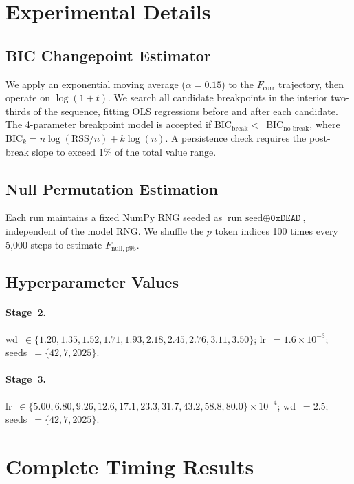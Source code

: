 \documentclass{article}
\newcommand{\fcorr}{F_{\mathrm{corr}}}
\begin{document}
\section{Experimental Details}
\label{app:details}

\subsection{BIC Changepoint Estimator}

We apply an exponential moving average ($\alpha{=}0.15$) to the
$\fcorr$ trajectory, then operate on $\log(1+t)$.
We search all candidate breakpoints in the interior two-thirds of
the sequence, fitting OLS regressions before and after each candidate.
The 4-parameter breakpoint model is accepted if BIC$_{\text{break}}
<$~BIC$_{\text{no-break}}$, where BIC$_k = n\log(\text{RSS}/n)
+ k\log(n)$.
A persistence check requires the post-break slope to exceed 1\% of
the total value range.

\subsection{Null Permutation Estimation}

Each run maintains a fixed NumPy RNG seeded as
$\text{run\_seed}\oplus\texttt{0xDEAD}$, independent of the model
RNG.
We shuffle the $p$ token indices 100 times every 5{,}000 steps to
estimate $F_{\mathrm{null,p95}}$.

\subsection{Hyperparameter Values}

\paragraph{Stage~2.}
wd~$\in\{1.20, 1.35, 1.52, 1.71, 1.93, 2.18, 2.45, 2.76, 3.11,
3.50\}$; lr~$=1.6\times10^{-3}$; seeds~$=\{42,7,2025\}$.

\paragraph{Stage~3.}
lr~$\in\{5.00, 6.80, 9.26, 12.6, 17.1, 23.3, 31.7, 43.2, 58.8,
80.0\}\times10^{-4}$; wd~$=2.5$; seeds~$=\{42,7,2025\}$.

\section{Complete Timing Results}
\label{app:scatter}
\end{document}
